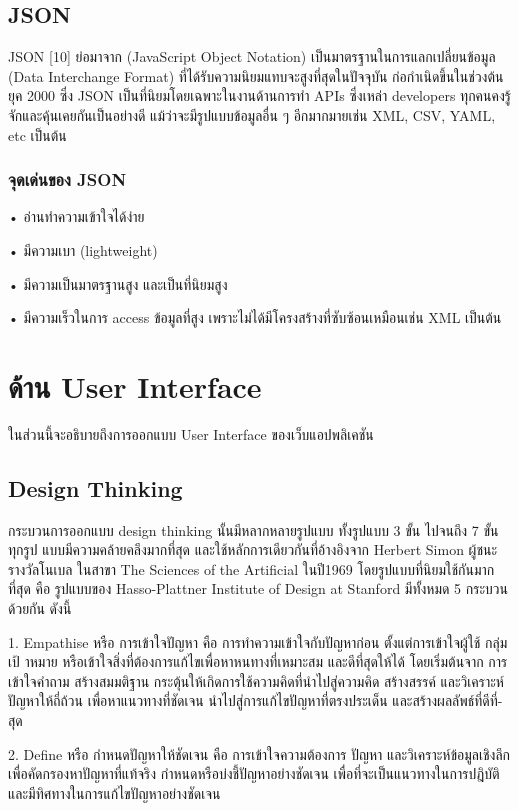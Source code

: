 \subsection{JSON}

JSON [10] ย่อมาจาก (JavaScript Object Notation) เป็นมาตรฐานในการแลกเปลี่ยนข้อมูล (Data Interchange Format) ที่ได้รับความนิยมแทบจะสูงที่สุดในปัจจุบัน ก่อกําเนิดขึ้นในช่วงต้นยุค 2000 ซึ่ง JSON
เป็นที่นิยมโดยเฉพาะในงานด้านการทํา APIs ซึ่งเหล่า developers ทุกคนคงรู้จักและคุ้นเคยกันเป็นอย่างดี
แม้ว่าจะมีรูปแบบข้อมูลอื่น ๆ อีกมากมายเช่น XML, CSV, YAML, etc เป็นต้น

\subsubsection{จุดเด่นของ JSON}

• อ่านทําความเข้าใจได้ง่าย

• มีความเบา (lightweight)

• มีความเป็นมาตรฐานสูง และเป็นที่นิยมสูง

• มีความเร็วในการ access ข้อมูลที่สูง เพราะไม่ได้มีโครงสร้างที่ซับซ้อนเหมือนเช่น XML เป็นต้น

\section{ด้าน User Interface}

ในส่วนนี้จะอธิบายถึงการออกแบบ User Interface ของเว็บแอปพลิเคชัน
\subsection{Design Thinking}

กระบวนการออกแบบ design thinking นั้นมีหลากหลายรูปแบบ ทั้งรูปแบบ 3 ขั้น ไปจนถึง 7 ขั้น ทุกรูป
แบบมีความคล้ายคลึงมากที่สุด และใช้หลักการเดียวกันที่อ้างอิงจาก Herbert Simon ผู้ชนะรางวัลโนเบล
ในสาขา The Sciences of the Artificial ในปี1969 โดยรูปแบบที่นิยมใช้กันมากที่สุด คือ รูปแบบของ
Hasso-Plattner Institute of Design at Stanford มีทั้งหมด 5 กระบวนด้วยกัน ดังนี้

1. Empathise หรือ การเข้าใจปัญหา คือ การทําความเข้าใจกับปัญหาก่อน ตั้งแต่การเข้าใจผู้ใช้ กลุ่ม
เป้ าหมาย หรือเข้าใจสิ่งที่ต้องการแก้ไขเพื่อหาหนทางที่เหมาะสม และดีที่สุดให้ได้ โดยเริ่มต้นจาก การ
เข้าใจคําถาม สร้างสมมติฐาน กระตุ้นให้เกิดการใช้ความคิดที่นําไปสู่ความคิด สร้างสรรค์ และวิเคราะห์
ปัญหาให้ถี่ถ้วน เพื่อหาแนวทางที่ชัดเจน นําไปสู่การแก้ไขปัญหาที่ตรงประเด็น และสร้างผลลัพธ์ที่ดีที่-
สุด

2. Define หรือ กําหนดปัญหาให้ชัดเจน คือ การเข้าใจความต้องการ ปัญหา และวิเคราะห์ข้อมูลเชิงลึก
เพื่อคัดกรองหาปัญหาที่แท้จริง กําหนดหรือบ่งชี้ปัญหาอย่างชัดเจน เพื่อที่จะเป็นแนวทางในการปฎิบัติ
และมีทิศทางในการแก้ไขปัญหาอย่างชัดเจน

